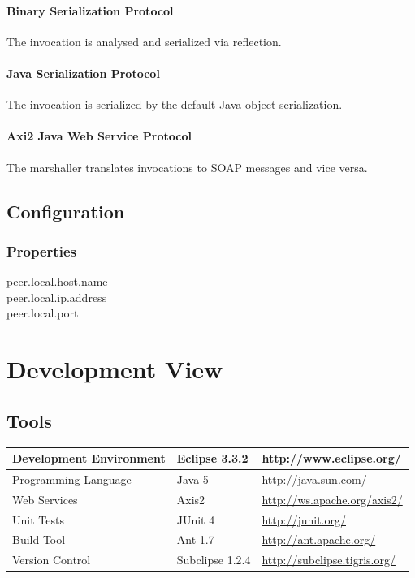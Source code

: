 \documentclass[a4paper]{article}
\begin{document}
\paragraph{Binary Serialization Protocol}

The invocation is analysed and serialized via reflection.

\paragraph{Java Serialization Protocol}

The invocation is serialized by the default Java object serialization.

\paragraph{Axi2 Java Web Service Protocol}

The marshaller translates invocations to SOAP messages and vice versa.

\subsection{Configuration}

\subsubsection{Properties}

peer.local.host.name\\
peer.local.ip.address\\
peer.local.port\\

\section{Development View}

\subsection{Tools}

	\begin{tabular}{|l|l|l|}
	\hline
	Development Environment & Eclipse 3.3.2 & \url{http://www.eclipse.org/}\\
	\hline
	Programming Language & Java 5 & \url{http://java.sun.com/}\\
	\hline
	Web Services & Axis2 & \url{http://ws.apache.org/axis2/}\\
	\hline
	Unit Tests & JUnit 4 & \url{http://junit.org/}\\
	\hline
	Build Tool & Ant 1.7 & \url{http://ant.apache.org/}\\
	\hline
	Version Control & Subclipse 1.2.4 & \url{http://subclipse.tigris.org/}\\
	\hline
	\end{tabular}
\end{document}

